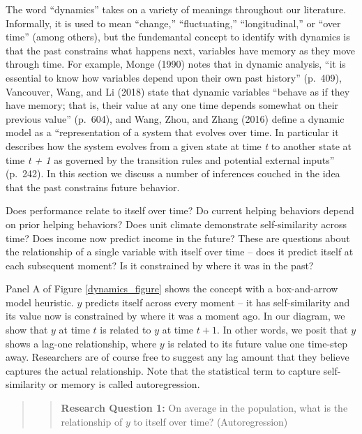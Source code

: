 \documentclass[english,,man]{apa6}
\begin{document}
The word \enquote{dynamics} takes on a variety of meanings throughout our literature. Informally, it is used to mean \enquote{change,} \enquote{fluctuating,} \enquote{longitudinal,} or \enquote{over time} (among others), but the fundemantal concept to identify with dynamics is that the past constrains what happens next, variables have memory as they move through time. For example, Monge (1990) notes that in dynamic analysis, \enquote{it is essential to know how variables depend upon their own past history} (p.~409), Vancouver, Wang, and Li (2018) state that dynamic variables \enquote{behave as if they have memory; that is, their value at any one time depends somewhat on their previous value} (p.~604), and Wang, Zhou, and Zhang (2016) define a dynamic model as a \enquote{representation of a system that evolves over time. In particular it describes how the system evolves from a given state at time \emph{t} to another state at time \emph{t + 1} as governed by the transition rules and potential external inputs} (p.~242). In this section we discuss a number of inferences couched in the idea that the past constrains future behavior.

Does performance relate to itself over time? Do current helping behaviors depend on prior helping behaviors? Does unit climate demonstrate self-similarity across time? Does income now predict income in the future? These are questions about the relationship of a single variable with itself over time -- does it predict itself at each subsequent moment? Is it constrained by where it was in the past?

Panel A of Figure \ref{dynamics_figure} shows the concept with a box-and-arrow model heuristic. \(y\) predicts itself across every moment -- it has self-similarity and its value now is constrained by where it was a moment ago. In our diagram, we show that \(y\) at time \(t\) is related to \(y\) at time \(t + 1\). In other words, we posit that \(y\) shows a lag-one relationship, where \(y\) is related to its future value one time-step away. Researchers are of course free to suggest any lag amount that they believe captures the actual relationship. Note that the statistical term to capture self-similarity or memory is called autoregression.

\begin{quote}
\begin{quote}
\textbf{Research Question 1:} On average in the population, what is the relationship of \(y\) to itself over time? (Autoregression)
\end{quote}
\end{quote}
\end{document}
